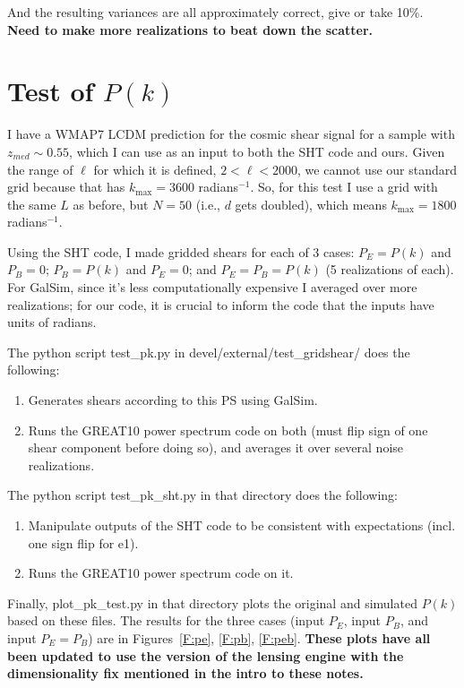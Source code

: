 \documentclass[preprint]{aastex}
\newcommand{\kmax}{\ensuremath{k_\mathrm{max}}}
\begin{document}
And the resulting variances are all approximately correct, give or
take 10\%. \textbf{Need to make more realizations to beat down the scatter.}

\section{Test of $P(k)$}\label{S:testpk}

I have a WMAP7 LCDM prediction for the cosmic shear signal for a
sample with $z_{med}\sim 0.55$, which I can use as an input to both
the SHT code and ours.  Given the range of $\ell$ for which it is
defined, $2<\ell<2000$, we cannot use our standard grid because that
has $\kmax=3600$ radians$^{-1}$.  So, for this test I use a grid with
the same $L$ as before, but $N=50$ (i.e., $d$ gets doubled), which
means $\kmax=1800$ radians$^{-1}$.

Using the SHT code, I made gridded shears for each of 3 cases:
$P_E=P(k)$ and $P_B=0$; $P_B=P(k)$ and $P_E=0$; and $P_E=P_B=P(k)$ (5
realizations of each).
For GalSim, since it's less computationally expensive I averaged over
more realizations; for our code, it is crucial to inform the code that
the inputs have units of radians.

The python script test\_pk.py in devel/external/test\_gridshear/ does the following:
\begin{enumerate}
\item Generates shears according to this PS using GalSim.
\item Runs the GREAT10 power spectrum code on both (must flip sign of
  one shear component before doing so), and averages it over several
  noise realizations.
\end{enumerate}

The python script test\_pk\_sht.py in that directory does the following:
\begin{enumerate}
\item Manipulate outputs of the SHT code to be consistent with
  expectations (incl. one sign flip for e1).
\item Runs the GREAT10 power spectrum code on it.
\end{enumerate}

Finally, plot\_pk\_test.py in that directory plots the original and
simulated $P(k)$ based on these files.  The results for the three
cases (input $P_E$, input $P_B$, and input $P_E=P_B$) are in
Figures~\ref{F:pe}, \ref{F:pb}, \ref{F:peb}.  \textbf{These plots have
  all been updated to use the version of the lensing engine with the
  dimensionality fix mentioned in the intro to these notes.}
\end{document}
